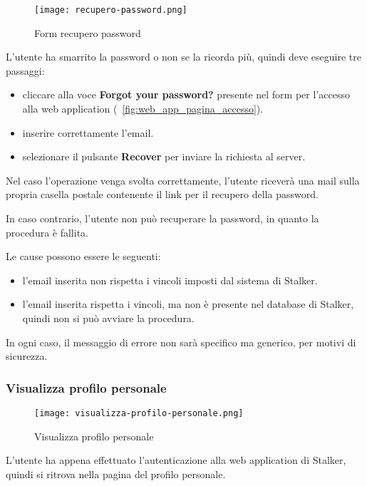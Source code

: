 \documentclass[../manuale-utente.tex]{subfiles}
\begin{document}
\begin{figure}[H]
    \centering
    \texttt{[image: recupero-password.png]}
    \caption{Form recupero password}%
    \label{fig:web_app_form_recupero_password}
\end{figure}

L'utente ha smarrito la password o non se la ricorda più, quindi deve eseguire tre passaggi:
\begin{itemize}
    \item cliccare alla voce \textbf{Forgot your password?} presente nel form per l'accesso alla web application (~\ref{fig:web_app_pagina_accesso}).
    \item inserire correttamente l'email.
    \item selezionare il pulsante \textbf{Recover} per inviare la richiesta al server.
\end{itemize}

Nel caso l'operazione venga svolta correttamente, l'utente riceverà una mail sulla propria casella postale contenente il link per il recupero della password.

In caso contrario, l'utente non può recuperare la password, in quanto la procedura è fallita.

Le cause possono essere le seguenti:
\begin{itemize}
    \item l'email inserita non rispetta i vincoli imposti dal sistema di Stalker.
    \item l'email inserita rispetta i vincoli, ma non è presente nel database di Stalker, quindi non si può avviare la procedura.
\end{itemize}

In ogni caso, il messaggio di errore non sarà specifico ma generico, per motivi di sicurezza.
\newpage

\subsubsection{Visualizza profilo personale}%
\label{subs:visualizza_profilo_personale}

\begin{figure}[H]
    \centering
    \texttt{[image: visualizza-profilo-personale.png]}
    \caption{Visualizza profilo personale}%
    \label{fig:web_app_visualizza_profilo_personale}
\end{figure}

L'utente ha appena effettuato l'autenticazione alla web application di Stalker, quindi si ritrova nella pagina del profilo personale.
\end{document}
